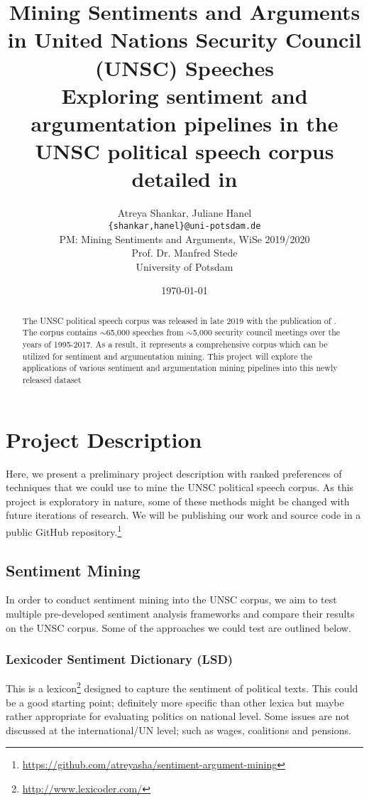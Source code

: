 \documentclass[12pt,a4paper]{article}
\title{Mining Sentiments and Arguments in United Nations Security Council (UNSC)
  Speeches \\[5pt]
\large Exploring sentiment and argumentation pipelines in the UNSC political
speech corpus detailed in \citet{schnfeld2019security}}
\author{Atreya Shankar, Juliane Hanel\\
\texttt{\{shankar,hanel\}@uni-potsdam.de} \\
PM: Mining Sentiments and Arguments, WiSe 2019/2020 \\
Prof. Dr. Manfred Stede \\
University of Potsdam}
\date{\today}
\begin{document}
\maketitle
\thispagestyle{empty}

\begin{abstract}\label{abstract} The UNSC political speech corpus was released
in late 2019 with the publication of \citet{schnfeld2019security}. The corpus
contains $\sim$65,000 speeches from $\sim$5,000 security council meetings over
the years of 1995-2017. As a result, it represents a comprehensive corpus which
can be utilized for sentiment and argumentation mining. This project will
explore the applications of various sentiment and argumentation mining pipelines
into this newly released dataset
\end{abstract}

\newpage \setcounter{page}{1} \thispagestyle{plain}

\section{Project Description}\label{sec:intro}

Here, we present a preliminary project description with ranked preferences of
techniques that we could use to mine the UNSC political speech corpus. As this
project is exploratory in nature, some of these methods might be changed with
future iterations of research. We will be publishing our work and source code in
a public GitHub
repository.\footnote{\url{https://github.com/atreyasha/sentiment-argument-mining}}

\subsection{Sentiment Mining}

In order to conduct sentiment mining into the UNSC corpus, we aim to test
multiple pre-developed sentiment analysis frameworks and compare their results
on the UNSC corpus. Some of the approaches we could test are outlined below.

\subsubsection{Lexicoder Sentiment Dictionary (LSD)}

This is a lexicon\footnote{\url{http://www.lexicoder.com/}} designed to capture
the sentiment of political texts. This could be a good starting point;
definitely more specific than other lexica but maybe rather appropriate for
evaluating politics on national level. Some issues are not discussed at the
international/UN level; such as wages, coalitions and pensions.
\end{document}
